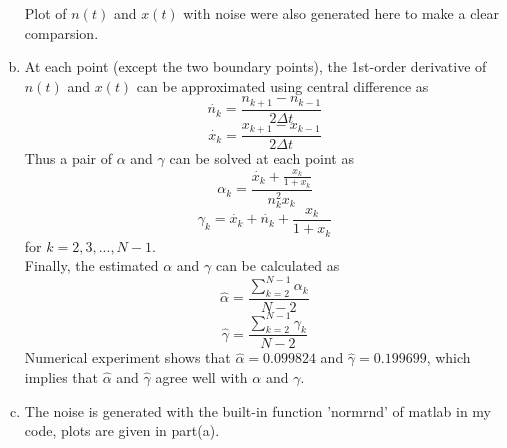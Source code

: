 \documentclass[paper=a4, fontsize=11pt]{scrartcl} %
\numberwithin{equation}{section} %
\numberwithin{figure}{section} %
\numberwithin{table}{section} %
\begin{document}
\begin{enumerate}[(a)]
			Plot of $n(t)$ and $x(t)$ with noise were also generated here to make a clear comparsion.
		\item 
			At each point (except the two boundary points), the 1st-order derivative of $n(t)$ and $x(t)$ can be approximated using central difference as
			\begin{equation}
				\dot{n_k} = \frac{n_{k+1}-n_{k-1}}{2 \Delta t} \label{si_eq1}
			\end{equation}
			\begin{equation}
				\dot{x_k} = \frac{x_{k+1}-x_{k-1}}{2 \Delta t} \label{si_eq2}
			\end{equation}
			Thus a pair of $\alpha$ and $\gamma$ can be solved at each point as
			\begin{equation}
				\alpha_k = \frac{\dot{x_k} + \frac{x_k}{1+x_k}}{n_k^2x_k}
			\end{equation}
			\begin{equation}
				\gamma_k = \dot{x_k} + \dot{n_k} + \frac{x_k}{1+x_k}
			\end{equation}
			for $k=2,3,...,N-1$.\\
			Finally, the estimated $\alpha$ and $\gamma$ can be calculated as
			\begin{equation}
				\hat{\alpha} = \frac{\sum_{k=2}^{N-1}\alpha_k}{N-2}
			\end{equation}
			\begin{equation}
				\hat{\gamma} = \frac{\sum_{k=2}^{N-1}\gamma_k}{N-2}
			\end{equation}
			Numerical experiment shows that $\hat{\alpha} = 0.099824$ and $\hat{\gamma} = 0.199699$, which implies that $\hat{\alpha}$ and $\hat{\gamma}$ agree well with $\alpha$ and $\gamma$.
		\item 
			The noise is generated with the built-in function 'normrnd' of matlab in my code, plots are given in part(a). 


\end{enumerate}
\end{document}
